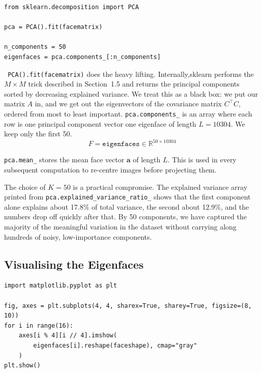 \documentclass[12pt,a4paper]{article}
\begin{document}
\vspace{0.5em}
\begin{minipage}{\linewidth}
\begin{lstlisting}[caption={Fitting PCA and extracting the top K eigenfaces}]
from sklearn.decomposition import PCA

pca = PCA().fit(facematrix)

n_components = 50
eigenfaces = pca.components_[:n_components]
\end{lstlisting}
\end{minipage}
\texttt{ PCA().fit(facematrix)} does the heavy lifting. Internally,sklearn performs the $M \times M$ trick described in Section~1.5 and returns
the principal components sorted by decreasing explained variance. We treat
this as a black box: we put our matrix $A$ in, and we get out the eigenvectors
of the covariance matrix $C^{\top}C$, ordered from most to least important.
\texttt{pca.components\_} is an array where each row is one principal component
vector one eigenface of length $L = 10304$. We keep only the first 50.
\newpage 
\[
F = \texttt{eigenfaces} \in \mathbb{R}^{50 \times 10304}
\]

\texttt{pca.mean\_} stores the mean face vector $\mathbf{a}$ of length $L$.
This is used in every subsequent computation to re-centre images before
projecting them.

The choice of $K = 50$ is a practical compromise. The explained variance
array printed from \texttt{pca.explained\_variance\_ratio\_} shows that the
first component alone explains about 17.8\% of total variance, the second
about 12.9\%, and the numbers drop off quickly after that. By 50 components,
we have captured the majority of the meaningful variation in the dataset
without carrying along hundreds of noisy, low-importance components.

\subsection{Visualising the Eigenfaces}

\vspace{0.5em}
\begin{minipage}{\linewidth}
\begin{lstlisting}[caption={Displaying the first 16 eigenfaces}]
import matplotlib.pyplot as plt

fig, axes = plt.subplots(4, 4, sharex=True, sharey=True, figsize=(8, 10))
for i in range(16):
    axes[i % 4][i // 4].imshow(
        eigenfaces[i].reshape(faceshape), cmap="gray"
    )
plt.show()
\end{lstlisting}
\end{minipage}
\end{document}

